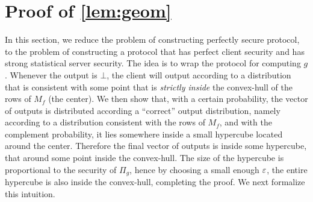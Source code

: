 \documentclass{llncs}
\newcommand{\bnote}[1]{\authnote{Bar}{#1}}
\begin{document}

\section{Proof of \texorpdfstring{\cref{lem:geom}}{Lemma 2}}\label{sec:geom}
In this section, we reduce the problem of constructing perfectly secure protocol, to the problem of constructing a protocol that has perfect client security and has strong statistical server security. The idea is to wrap the protocol for computing $g$. Whenever the output is $\bot$, the client will output according to a distribution that is consistent with some point that is \emph{strictly inside} the convex-hull of the rows of $M_f$ (\eg the center).
\ifdefined\IsFV
We then show that, with a certain probability, the vector of outputs is distributed according a ``correct'' output distribution, namely according to a distribution consistent with the rows of $M_f$, and with the complement probability, it lies somewhere inside a small hypercube located around the center. Therefore the final vector of outputs is inside some hypercube, that around some point inside the convex-hull. The size of the hypercube is proportional to the security of $\Pi_g$, hence by choosing a small enough $\varepsilon$, the entire hypercube is also inside the convex-hull, completing the proof. We next formalize this intuition.
\else\fi
\end{document}
